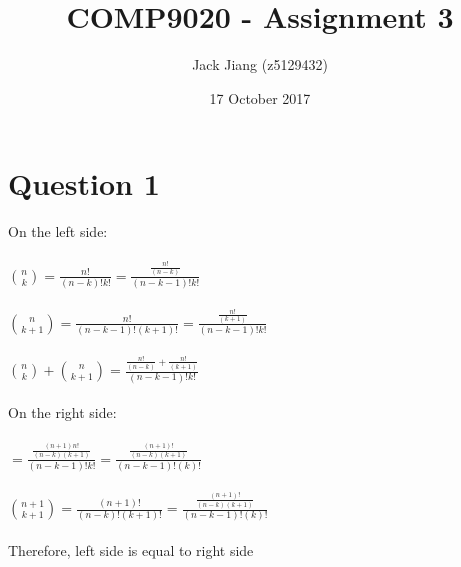 \documentclass[11pt, a4paper]{article}
\begin{document}
\title{COMP9020 - Assignment 3}
\author{Jack Jiang (z5129432)}
\date{ 17 October 2017 }
\maketitle
\graphicspath{{/}}

\section*{Question 1}
    On the left side:\\
    \\
    $ \binom nk = \frac{n!}{(n-k)!k!} = \frac {\frac {n!}{(n-k)}}{(n-k-1)!k!} $\\
    \\
    $ \binom {n}{k+1} = \frac {n!}{(n-k-1)!(k+1)!} = \frac {\frac {n!}{(k+1)}}{(n-k-1)!k!} $\\
    \\
    $ \binom nk + \binom {n}{k+1} = \frac {\frac {n!}{(n-k)} + \frac{n!}{(k+1)} }{(n-k-1)!k!}$\\
    \\
    On the right side:\\
    \\
    $ =  \frac {\frac {(n+1)n!}{(n-k)(k+1)} }{(n-k-1)!k!} = \frac { \frac {(n+1)!}{(n-k)(k+1)} }{(n-k-1)!(k)!} $\\
    \\
    $ \binom {n+1}{k+1} = \frac {(n+1)!}{(n-k)!(k+1)!}  =  \frac { \frac {(n+1)!}{(n-k)(k+1)} }{(n-k-1)!(k)!} $\\
    \\
    Therefore, left side is equal to right side
\end{document}
